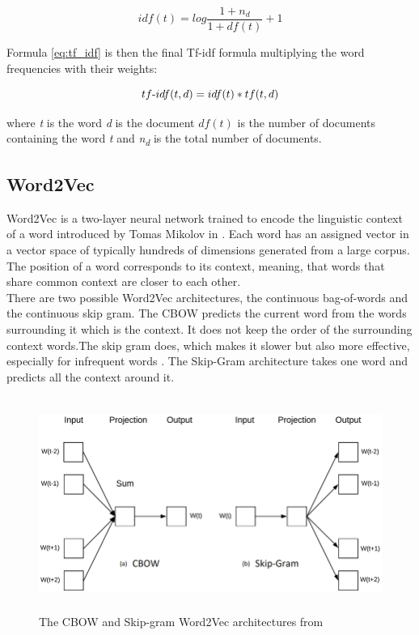 \begin{equation}
idf(t) = log\frac{1+n_d}{1+df(t)} + 1
\end{equation}

Formula \ref{eq:tf_idf} is then the final Tf-idf formula multiplying the word frequencies with their weights:

\begin{equation}\label{eq:tf_idf}
tf\textnormal{-}idf(t,d) = idf(t)*tf(t,d) 
\end{equation}

where \textit{t} is the word \textit{d} is the document $ df(t) $ is the number of documents containing the word \textit{t} and \textit{n\textsubscript{d}} is the total number of documents. 

\subsection{Word2Vec}
Word2Vec is a two-layer neural network trained to encode the linguistic context of a word introduced by Tomas Mikolov in \cite{DBLP:journals/corr/abs-1301-3781}. Each word has an assigned vector in a vector space of typically hundreds of dimensions generated from a large corpus. The position of a word corresponds to its context, meaning, that words that share common context are closer to each other. \\
There are two possible Word2Vec architectures, the continuous bag-of-words and the continuous skip gram. The CBOW predicts the current word from the words surrounding it which is the context. It does not keep the order of the surrounding context words.The skip gram does, which makes it slower but also more effective, especially for infrequent words \cite{DBLP:journals/corr/abs-1301-3781}. The Skip-Gram architecture takes one word and predicts all the context around it.
\begin{figure}[h]
    \centering
	\includegraphics[height=70mm]{./img/cbow_skipgram_w2v_architecture.png}
	\caption{The CBOW and Skip-gram Word2Vec architectures from \cite{phdthesis}}
	\label{fig:cbow_skipgram_w2v_architecture}
\end{figure}
